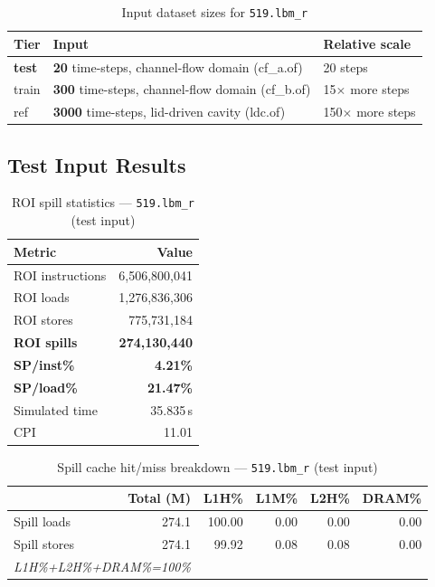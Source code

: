 \documentclass[11pt,a4paper]{article}
\begin{document}
\begin{table}[H]
\centering
\caption{Input dataset sizes for \texttt{519.lbm\_r}}
\label{tab:lbm_inputs}
\small
\begin{tabular}{lp{8cm}l}
\toprule
\textbf{Tier} & \textbf{Input} & \textbf{Relative scale} \\
\midrule
\textbf{test} & \textbf{20} time-steps, channel-flow domain (cf\_a.of) & 20 steps \\
train & \textbf{300} time-steps, channel-flow domain (cf\_b.of) & 15$\times$ more steps \\
ref & \textbf{3000} time-steps, lid-driven cavity (ldc.of) & 150$\times$ more steps \\
\bottomrule
\end{tabular}
\end{table}

\subsection{Test Input Results}

\begin{table}[H]
\centering
\caption{ROI spill statistics --- \texttt{519.lbm\_r} (test input)}
\label{tab:lbm_test_roi}
\begin{tabular}{lr}
\toprule
\textbf{Metric} & \textbf{Value} \\
\midrule
ROI instructions & 6,506,800,041 \\
ROI loads        & 1,276,836,306 \\
ROI stores       & 775,731,184 \\
\textbf{ROI spills}   & \textbf{274,130,440} \\
\textbf{SP/inst\%}   & \textbf{4.21\%} \\
\textbf{SP/load\%}   & \textbf{21.47\%} \\
Simulated time   & 35.835\,s \\
CPI              & 11.01 \\
\bottomrule
\end{tabular}
\end{table}

\begin{table}[H]
\centering
\caption{Spill cache hit/miss breakdown --- \texttt{519.lbm\_r} (test input)}
\label{tab:lbm_test_cache}
\begin{tabular}{lrrrrr}
\toprule
\textbf{} & \textbf{Total (M)} & \textbf{L1H\%} & \textbf{L1M\%} & \textbf{L2H\%} & \textbf{DRAM\%} \\
\midrule
Spill loads  & 274.1 & 100.00 & 0.00 & 0.00 & 0.00 \\
Spill stores & 274.1 & 99.92 & 0.08 & 0.08 & 0.00 \\
\multicolumn{2}{l}{\small\textit{L1H\%+L2H\%+DRAM\%=100\%}} \\
\bottomrule
\end{tabular}
\end{table}
\end{document}
